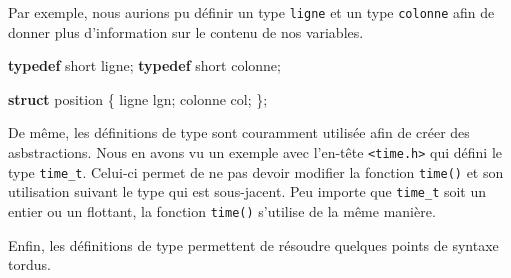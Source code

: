 \documentclass[]{article}
\newenvironment{Shaded}{}{}
\newcommand{\KeywordTok}[1]{\textcolor[rgb]{0.00,0.44,0.13}{\textbf{{#1}}}}
\newcommand{\DataTypeTok}[1]{\textcolor[rgb]{0.56,0.13,0.00}{{#1}}}
\newcommand{\NormalTok}[1]{{#1}}
\begin{document}
Par exemple, nous aurions pu définir un type \texttt{ligne} et un type
\texttt{colonne} afin de donner plus d'information sur le contenu de nos
variables.

\begin{Shaded}
\begin{Highlighting}[]
\KeywordTok{typedef} \DataTypeTok{short} \NormalTok{ligne;}
\KeywordTok{typedef} \DataTypeTok{short} \NormalTok{colonne;}

\KeywordTok{struct} \NormalTok{position}
\NormalTok{\{}
    \NormalTok{ligne lgn;}
    \NormalTok{colonne col;}
\NormalTok{\};}
\end{Highlighting}
\end{Shaded}

De même, les définitions de type sont couramment utilisée afin de créer
des asbstractions. Nous en avons vu un exemple avec l'en-tête
\texttt{\textless{}time.h\textgreater{}} qui défini le type
\texttt{time\_t}. Celui-ci permet de ne pas devoir modifier la fonction
\texttt{time()} et son utilisation suivant le type qui est sous-jacent.
Peu importe que \texttt{time\_t} soit un entier ou un flottant, la
fonction \texttt{time()} s'utilise de la même manière.

Enfin, les définitions de type permettent de résoudre quelques points de
syntaxe tordus.
\end{document}
